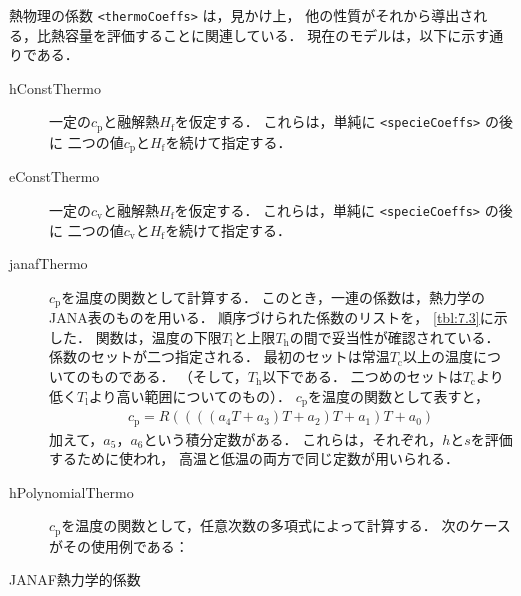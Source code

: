 熱物理の係数 \verb|<thermoCoeffs>| は，見かけ上，
他の性質がそれから導出される，比熱容量を評価することに関連している．
現在のモデルは，以下に示す通りである．
\begin{description}
 \item[hConstThermo]
            一定の$c_{\mathrm{p}}$と融解熱$H_{\mathrm{f}}$を仮定する．
            これらは，単純に \verb|<specieCoeffs>| の後に
            二つの値$c_{\mathrm{p}}$と$H_{\mathrm{f}}$を続けて指定する．
 \item[eConstThermo]
            一定の$c_{\mathrm{v}}$と融解熱$H_{\mathrm{f}}$を仮定する．
            これらは，単純に \verb|<specieCoeffs>| の後に
            二つの値$c_{\mathrm{v}}$と$H_{\mathrm{f}}$を続けて指定する．
 \item[janafThermo]
            $c_{\mathrm{p}}$を温度の関数として計算する．
            このとき，一連の係数は，熱力学のJANA表のものを用いる．
            順序づけられた係数のリストを，
            \autoref{tbl:7.3}に示した．
            関数は，温度の下限$T_{\mathrm{l}}$と上限$T_{\mathrm{h}}$の間で妥当性が確認されている．
            係数のセットが二つ指定される．
            最初のセットは常温$T_{\mathrm{c}}$以上の温度についてのものである．
            （そして，$T_{\mathrm{h}}$以下である．
            二つめのセットは$T_{\mathrm{c}}$より低く$T_{\mathrm{l}}$より高い範囲についてのもの）．
            $c_{\mathrm{p}}$を温度の関数として表すと，
\begin{align}
 \label{eq:7.1}
 c_{\mathrm{p}} = R((((a_{4}T + a_{3})T + a_{2})T + a_{1})T + a_{0})
\end{align}
            加えて，$a_{5}$，$a_{6}$という積分定数がある．
            これらは，それぞれ，$h$と$s$を評価するために使われ，
            高温と低温の両方で同じ定数が用いられる．
 \item[hPolynomialThermo]
            $c_{\mathrm{p}}$を温度の関数として，任意次数の多項式によって計算する．
            次のケースがその使用例である：
\end{description}


\begin{table}[ht]
 
 \caption{JANAF熱力学的係数}
 \label{tbl:7.3}
\end{table}


